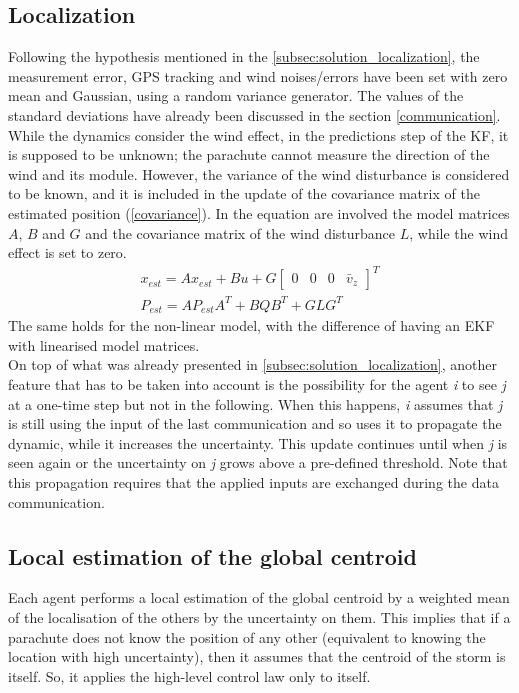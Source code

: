 \subsection{Localization}
Following the hypothesis mentioned in the \autoref{subsec:solution_localization}, the measurement error, GPS tracking and wind noises/errors have been set with zero mean and Gaussian, using a random variance generator. The values of the standard deviations have already been discussed in the section \ref{communication}.\\
While the dynamics consider the wind effect, in the predictions step of the KF, it is supposed to be unknown; the parachute cannot measure the direction of the wind and its module. However, the variance of the wind disturbance is considered to be known, and it is included in the update of the covariance matrix of the estimated position (\ref{covariance}). In the equation are involved the model matrices $A$, $B$ and $G$ and the covariance matrix of the wind disturbance $L$, while the wind effect is set to zero.
\begin{gather}
    \label{prediction}
    x_{est} = Ax_{est}+Bu+G\begin{bmatrix}
        0 & 0 & 0 & \bar{v}_z
    \end{bmatrix}^T\\
    \label{covariance}
    P_{est} = AP_{est}A^T+BQB^T+GLG^T
\end{gather}
The same holds for the non-linear model, with the difference of having an EKF with linearised model matrices.\\
On top of what was already presented in \autoref{subsec:solution_localization}, another feature that has to be taken into account is the possibility for the agent \textit{i} to see \textit{j} at a one-time step but not in the following. When this happens, \textit{i} assumes that \textit{j} is still using the input of the last communication and so uses it to propagate the dynamic, while it increases the uncertainty. This update continues until when \textit{j} is seen again or the uncertainty on \textit{j} grows above a pre-defined threshold. Note that this propagation requires that the applied inputs are exchanged during the data communication.

\subsection{Local estimation of the global centroid}
Each agent performs a local estimation of the global centroid by a weighted mean of the localisation of the others by the uncertainty on them. This implies that if a parachute does not know the position of any other (equivalent to knowing the location with high uncertainty), then it assumes that the centroid of the storm is itself. So, it applies the high-level control law only to itself. 

